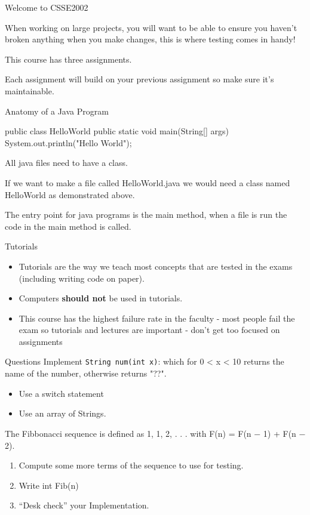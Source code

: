 \documentclass[week2]{csse2002}
\begin{document}
\begin{topic}{Welcome to CSSE2002}
\begin{subtopic}{6}
When working on large projects, you will want to be able to ensure you haven't broken anything when you make changes, this is where testing comes in handy!
\end{subtopic}

\begin{subtopic}{7}
This course has three assignments.

Each assignment will build on your previous assignment so make sure it's maintainable.
\end{subtopic}

\end{topic}

\begin{topic}{Anatomy of a Java Program}
\begin{java}
public class HelloWorld {
    public static void main(String[] args) {
        System.out.println("Hello World");
    }
}
\end{java}

All java files need to have a class.

If we want to make a file called HelloWorld.java we would need a class named HelloWorld as demonstrated above.

The entry point for java programs is the main method, when a file is run the code in the main method is called.
\end{topic}

\begin{topic}{Tutorials}
\begin{itemize}
\item Tutorials are the way we teach most concepts that are tested in the exams (including writing code on paper).

\item Computers \textbf{should not} be used in tutorials.

\item This course has the highest failure rate in the faculty - most people fail the exam so tutorials and lectures are important - don't get too focused on assignments
\end{itemize}
\end{topic}

\begin{topic}{Questions}
Implement \texttt{String num(int x)}: which for 0 < x < 10 returns the name of the number, otherwise returns "??".
\begin{itemize}
	\item Use a switch statement
	\item Use an array of Strings.
\end{itemize}

The Fibbonacci sequence is defined as 1, 1, 2, . . . with F(n) = F(n − 1) + F(n − 2).
\begin{enumerate}
	\item Compute some more terms of the sequence to use for testing.
	\item Write int Fib(n)
	\item “Desk check” your Implementation.
\end{enumerate}
\end{topic}
\end{document}
